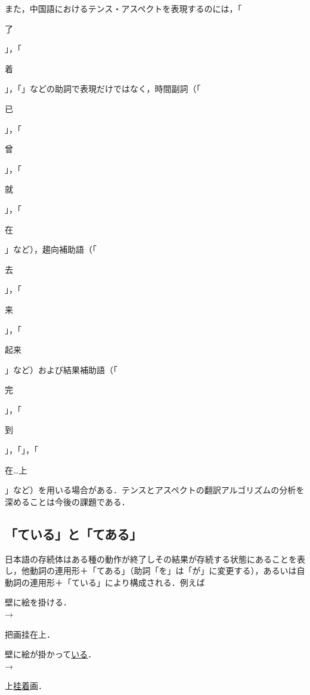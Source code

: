 \documentclass[japanese]{jnlp_1.4}
\newcommand{\inHRei}[1]{}
\begin{document}
また，中国語におけるテンス・アスペクトを表現するのには，「\begin{簡体中文}了\end{簡体中文}」，「\begin{簡体中文}着\end{簡体中文}」，「」などの助詞で表現だけではなく，時間副詞（「\begin{簡体中文}已\end{簡体中文}」，「\begin{簡体中文}曾\end{簡体中文}」，「\begin{簡体中文}就\end{簡体中文}」，「\begin{簡体中文}在\end{簡体中文}」など），趨向補助語（「\begin{簡体中文}去\end{簡体中文}」，「\begin{簡体中文}来\end{簡体中文}」，「\begin{簡体中文}起来\end{簡体中文}」など）および結果補助語（「\begin{簡体中文}完\end{簡体中文}」，「\begin{簡体中文}到\end{簡体中文}」，「」，「\begin{簡体中文}在…上\end{簡体中文}」など）を用いる場合がある．テンスとアスペクトの翻訳アルゴリズムの分析を深めることは今後の課題である．


\subsection{「ている」と「てある」}

日本語の存続体はある種の動作が終了しその結果が存続する状態にあることを表し，他動詞の連用形＋「てある」（助詞「を」は「が」に変更する），あるいは自動詞の連用形＋「ている」により構成される．例えば

\inHRei{(13)}
壁に絵を掛ける．\\
→\begin{簡体中文}把画挂在上．\end{簡体中文}

\inHRei{(14)}
壁に絵が掛かって\ul{いる}．\\
→\begin{簡体中文}上\ul{挂着}画．\end{簡体中文}
\end{document}
